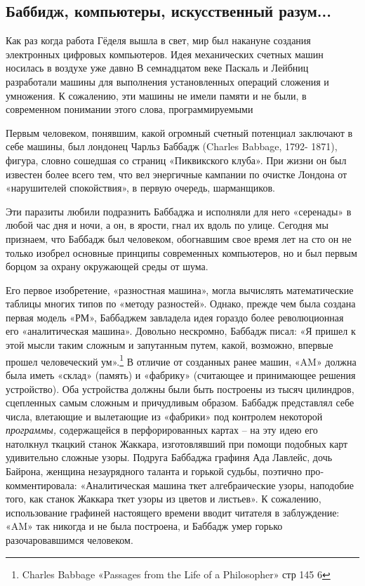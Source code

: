 \documentclass[../main.tex]{subfiles}
\begin{document}
\subsection{Баббидж, компьютеры, искусственный разум...}

Как раз когда работа Гёделя вышла в свет, мир был накануне создания электронных цифровых компьютеров. Идея механических счетных машин носилась в воздухе уже давно В семнадцатом веке Паскаль и Лейбниц разработали машины для выполнения установленных операций сложения и умножения. К сожалению, эти машины не имели памяти и не были, в современном понимании этого слова, программируемыми

Первым человеком, понявшим, какой огромный счетный потенциал заключают в себе машины, был лондонец Чарльз Баббадж (Charles Babbage, 1792- 1871), фигура, словно сошедшая со страниц «Пиквикского клуба». При жизни он был известен более всего тем, что вел энергичные кампании по очистке Лондона от «нарушителей спокойствия», в первую очередь, шарманщиков.

Эти паразиты любили подразнить Баббаджа и исполняли для него «серенады» в любой час дня и ночи, а он, в ярости, гнал их вдоль по улице. Сегодня мы признаем, что Баббадж был человеком, обогнавшим свое время лет на сто он не только изобрел основные принципы современных компьютеров, но и был первым борцом за охрану окружающей среды от шума.

Его первое изобретение, «разностная машина», могла вычислять математические таблицы многих типов по «методу разностей». Однако, прежде чем была создана первая модель «РМ», Баббаджем завладела идея гораздо более революционная его «аналитическая машина». Довольно нескромно, Баббадж писал: «Я пришел к этой мысли таким сложным и запутанным путем, какой, возможно, впервые прошел человеческий ум».\footnote{Charles Babbage «Passages from the Life of a Philosopher» стр 145 6} В отличие от созданных ранее машин, «AM» должна была иметь «склад» (память) и «фабрику» (считающее и принимающее решения устройство). Оба устройства должны были быть построены из тысяч цилиндров, сцепленных самым сложным и причудливым образом. Баббадж представлял себе числа, влетающие и вылетающие из «фабрики» под контролем некоторой \emph{программы,} содержащейся в перфорированных картах \--- на эту идею его натолкнул ткацкий станок Жаккара, изготовлявший при помощи подобных карт удивительно сложные узоры. Подруга Баббаджа графиня Ада Лавлейс, дочь Байрона, женщина незаурядного таланта и горькой судьбы, поэтично про­комментировала: «Аналитическая машина ткет алгебраические узоры, наподобие того, как станок Жаккара ткет узоры из цветов и листьев». К сожалению, использование графиней настоящего времени вводит читателя в заблуждение: «AM» так никогда и не была построена, и Баббадж умер горько разочаровавшимся человеком.
\end{document}
